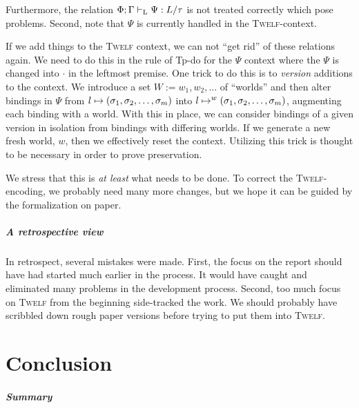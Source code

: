 \documentclass[a4paper, oneside, 10pt, final]{memoir}
\newcommand{\twelf}{\textsc{Twelf}}
\begin{document}
Furthermore, the relation $\Phi;\Gamma |-_{\mathrm{L}} \Psi : L / \tau$ is not
treated correctly which pose problems. Second, note that $\Psi$ is
currently handled in the \twelf{}-context.

If we add things to the \twelf{} context, we can not ``get rid'' of
these relations again. We need to do this in the rule of Tp-do for the
$\Psi$ context where the $\Psi$ is changed into $\cdot$ in the
leftmost premise. One trick to do this is to \emph{version} additions
to the context. We introduce a set $W := w_1, w_2, \dotsc$ of
``worlds'' and then alter bindings in $\Psi$ from $l \mapsto
(\sigma_1, \sigma_2, \dotsc, \sigma_m)$ into $l \mapsto^{w} (\sigma_1, \sigma_2, \dotsc, \sigma_m)$, augmenting each binding with
a world. With this in place, we can consider bindings of a
given version in isolation from bindings with differing worlds. If
we generate a new fresh world, $w$, then we effectively reset the
context. Utilizing this trick is thought to be necessary in order to
prove preservation.

We stress that this is \emph{at least} what needs to be done. To
correct the \twelf{}-encoding, we probably need many more changes, but
we hope it can be guided by the formalization on paper.

\paragraph{A retrospective view}

In retrospect, several mistakes were made. First, the focus on the
report should have had started much earlier in the process. It would
have caught and eliminated many problems in the development
process. Second, too much focus on \twelf{} from the beginning
side-tracked the work. We should probably have scribbled down rough
paper versions before trying to put them into \twelf{}.

\chapter{Conclusion}

\paragraph{Summary}
\end{document}
